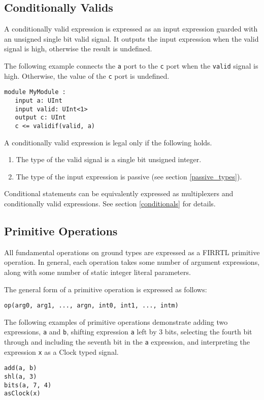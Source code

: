 \documentclass[12pt]{article}
\begin{document}
\subsection{Conditionally Valids} \label{conditionally_valids}

A conditionally valid expression is expressed as an input expression guarded with an unsigned single bit valid signal. It outputs the input expression when the valid signal is high, otherwise the result is undefined.

The following example connects the \verb|a| port to the \verb|c| port when the \verb|valid| signal is high. Otherwise, the value of the \verb|c| port is undefined.
\begin{lstlisting}
module MyModule :
   input a: UInt
   input valid: UInt<1>
   output c: UInt
   c <= validif(valid, a)
\end{lstlisting}

A conditionally valid expression is legal only if the following holds.
\begin{enumerate}
\item The type of the valid signal is a single bit unsigned integer.
\item The type of the input expression is passive (see section \ref{passive_types}).
\end{enumerate}

Conditional statements can be equivalently expressed as multiplexers and conditionally valid expressions. See section \ref{conditionals} for details.

\subsection{Primitive Operations}

All fundamental operations on ground types are expressed as a FIRRTL primitive operation. In general, each operation takes some number of argument expressions, along with some number of static integer literal parameters.

The general form of a primitive operation is expressed as follows:
\begin{lstlisting}
op(arg0, arg1, ..., argn, int0, int1, ..., intm)
\end{lstlisting}

The following examples of primitive operations demonstrate adding two expressions, \verb|a| and \verb|b|, shifting expression \verb|a| left by 3 bits, selecting the fourth bit through and including the seventh bit in the \verb|a| expression, and interpreting the expression \verb|x| as a Clock typed signal.
\begin{lstlisting}
add(a, b)
shl(a, 3)
bits(a, 7, 4)
asClock(x)
\end{lstlisting}
\end{document}
